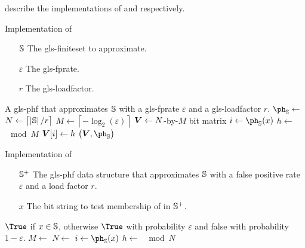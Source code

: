 \documentclass[ ../main.tex]{subfiles}
\begin{document}
 describe the implementations of \MakeApproxSet and \Contains respectively.
\begin{algorithm}[h]
    \caption{Implementation of \protect\MakeApproxSet}
    \label{alg:PHF}
    \KwIn
    {
        \begin{itemize}
            \item[$\mathbb{S}$] The \gls{gls-finiteset} to approximate.
            \item[$\varepsilon$] The \gls{gls-fprate}.
            \item[$r$] The \gls{gls-loadfactor}.
        \end{itemize}
    }
    \KwOut
    {
        A \gls{gls-phf} that approximates $\mathbb{S}$ with a \gls{gls-fprate} $\varepsilon$ and a \gls{gls-loadfactor} $r$.
    }
    {
        $\ph_{\St} \gets$ \;
        $N \gets \left\lceil \left\vert{\mathbb{S}}\right\vert / r \right\rceil$\;
        $M \gets \left\lceil -\log_2\!\left(\varepsilon\right) \right\rceil$\;
        $\boldsymbol{V} \gets N$-by-$M$ bit matrix\;
        {
            $i \gets \ph_{\St}\!\left(x\right)$\;
            $h \gets$ $\mod M$\;
            $\boldsymbol{V}\!\left[i\right] \gets h$\;
        }
        \Return $\left(\matrx{V}, \ph_{\St}\right)$\;
    }
\end{algorithm}
\begin{algorithm}[h]
    \caption{Implementation of \protect\Contains}
    \label{alg:PHF_has}
    \KwIn
    {
        \begin{enumerate}
            \item[$\mathbb{S}^+$] The \gls{gls-phf} data structure that approximates $\mathbb{S}$ with a false positive rate $\varepsilon$ and a load factor $r$.
            \item[$x$] The bit string to test membership of in $\mathbb{S}^+$.
        \end{enumerate}
    }
    \KwOut
    {
        $\True$ if $x \in \mathbb{S}$, otherwise $\True$ with probability $\varepsilon$ and false with probability $1 - \varepsilon$.
    }
    {
        $M \gets$ \;
        $N \gets$ \;
        $i \gets \ph_{\St}\!\left(x\right)$\;
        $h \gets$ $ \mod N$\;
        \;
    }
\end{algorithm}
\end{document}
